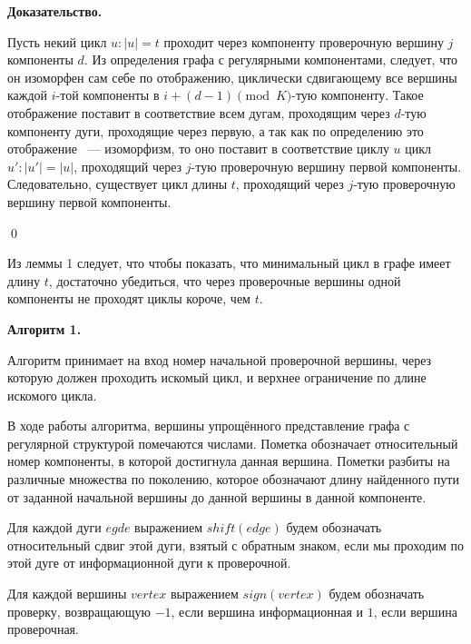 \documentclass[14pt]{mmcs-article}
\begin{document}
\textbf{Доказательство.}

Пусть некий цикл $u: |u| = t$ проходит через компоненту проверочную вершину $j$ компоненты $d$. Из определения графа с регулярными компонентами, следует, что он изоморфен сам себе по отображению, циклически сдвигающему все вершины каждой $i$-той компоненты в $i + (d - 1) \pmod K$-тую компоненту. Такое отображение поставит в соответствие всем дугам, проходящим через $d$-тую компоненту дуги, проходящие через первую, а так как по определению это отображение ~--- изоморфизм, то оно поставит в соответствие циклу $u$ цикл $u': |u'| = |u|$, проходящий через $j$-тую проверочную вершину первой компоненты. Следовательно, существует цикл длины $t$, проходящий через $j$-тую проверочную вершину первой компоненты.

\qed

Из леммы 1 следует, что чтобы показать, что минимальный цикл в графе имеет длину $t$, достаточно убедиться, что через проверочные вершины одной компоненты не проходят циклы короче, чем $t$.

\textbf{Алгоритм 1.} 

Алгоритм принимает на вход номер начальной проверочной вершины, через которую должен проходить искомый цикл, и верхнее ограничение по длине искомого цикла.

В ходе работы алгоритма, вершины упрощённого представление графа с регулярной структурой помечаются числами. Пометка обозначает относительный номер компоненты, в которой достигнула данная вершина. Пометки разбиты на различные множества по поколению, которое обозначают длину найденного пути от заданной начальной вершины до данной вершины в данной компоненте.

Для каждой дуги $egde$ выражением $shift(edge)$ будем обозначать относительный сдвиг этой дуги, взятый с обратным знаком, если мы проходим по этой дуге от информационной дуги к проверочной.

Для каждой вершины $vertex$ выражением $sign(vertex)$ будем обозначать проверку, возвращающую $-1$, если вершина информационная и $1$, если вершина проверочная.
\end{document}
